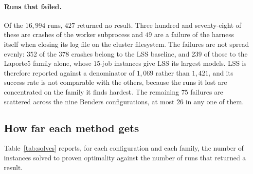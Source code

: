 \paragraph{Runs that failed.}
Of the $16{,}994$ runs, $427$ returned no result. Three hundred and seventy-eight of
these are crashes of the worker subprocess and $49$ are a failure of the harness itself
when closing its log file on the cluster filesystem. The failures are not spread
evenly: $352$ of the $378$ crashes belong to the LSS baseline, and $239$ of those to
the Laporte5 family alone, whose $15$-job instances give LSS its largest models. LSS is
therefore reported against a denominator of $1{,}069$ rather than $1{,}421$, and its
success rate is not comparable with the others, because the runs it lost are
concentrated on the family it finds hardest. The remaining $75$ failures are scattered
across the nine Benders configurations, at most $26$ in any one of them.

\subsection{How far each method gets}\label{ssec:results-solved}

Table~\ref{tab:solves} reports, for each configuration and each family, the number of
instances solved to proven optimality against the number of runs that returned a
result.

